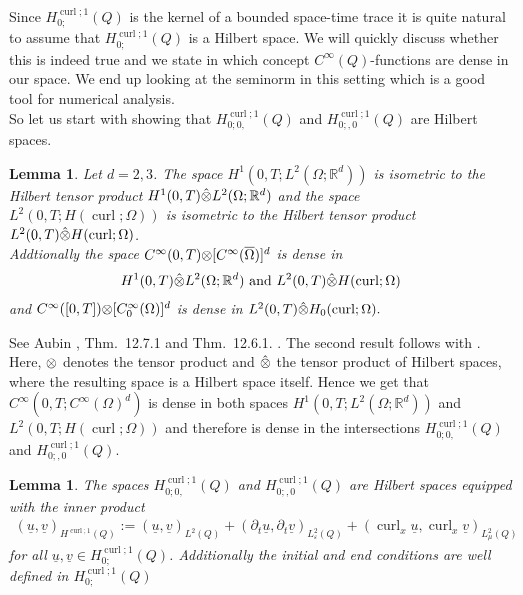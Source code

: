 \documentclass[a4paper,11pt]{article}
\newtheorem{lem}[thm]{Lemma}
\newcommand{\R}{\mathbb R}
\newcommand{\cu}{\operatorname{curl}}
\renewcommand{\vec}[1]{\underline{#1}}
\begin{document}
 
	Since $ H^{\cu;1}_{0;}(Q) $ is the kernel of a bounded space-time trace it is quite natural to assume that  $ H^{\cu;1}_{0;}(Q) $ is a Hilbert space. We will quickly discuss whether this is indeed true and we state in which concept $C^\infty(Q)$-functions are dense in our space. We end up looking at the  seminorm in this setting which is a good tool for numerical analysis.\\
So let us start with showing that  $H^{\cu;1}_{0;0,}(Q)$ and $H^{\cu;1}_{0;,0}(Q)$ are Hilbert spaces.

\begin{lem}\label{lem:C0inf_dense}
	Let $d=2,3$. The space $	H^1(0,T;L^2(\Omega;\R^d)) $ is isometric to the Hilbert tensor product $H^1(0,T)\hat{\tens}L^2(\Omega;\R^d)$ and the space $L^2(0,T;H(\cu;\Omega))$ is isometric to the Hilbert tensor product $ L^2(0,T)\hat{\tens}H(\cu;\Omega)$.\\
	Addtionally the space $C^\infty(0,T){\tens} [C^\infty(\overline{\Omega})]^d$ is dense in
	\begin{align*}
		H^1(0,T)\hat{\tens}L^2(\Omega;\R^d)\ \mathrm{ and }\	L^2(0,T)\hat{\tens}H(\cu;\Omega)
	\end{align*}
	and $C^\infty([0,T]){\tens} [C_0^\infty(\Omega)]^d $ is dense in $	L^2(0,T)\hat{\tens}H_0(\cu;\Omega).$
\end{lem}
See Aubin \cite{aubin}, Thm.~12.7.1 and Thm.~12.6.1. . The second result follows with \cite[ Ch 1.6.]{weidmann}.  Here, $\tens$  denotes the tensor product and $\hat{\tens}$ the tensor product of Hilbert spaces, where the resulting space is a Hilbert space itself. Hence we get that  {$C^\infty(0,T;C^\infty(\Omega)^d)$}  is  dense in both spaces $H^1(0,T;L^2(\Omega;\R^d))$ and $L^2(0,T;H(\cu;\Omega))$ and therefore is dense in the intersections $H^{\cu;1}_{0;0,}(Q)$ and $H^{\cu;1}_{0;,0}(Q)$.\\
\begin{lem}\label{lem:space_time_HR}
	The spaces $H^{\cu;1}_{0;0,}(Q)$ and $H^{\cu;1}_{0;,0}(Q)$ are Hilbert spaces equipped with the inner product 
	\begin{align}
		\label{eqn:scalar_prod}
		(\vec u, \vec v)_{H^{\cu;1}(Q)} := (\vec u,\vec v)_{L^2(Q)} +(\partial_t \vec u,\partial_t \vec v)_{L^2_{\varepsilon}(Q)}+(\cu_x \vec u,\cu_x \vec v)_{L^2_{\mu}(Q)}
	\end{align}
	for all $ \vec u,\vec v \in H^{\cu;1}_{0;}(Q)$. Additionally the initial and end conditions are well defined in $H^{\cu;1}_{0;}(Q)$
\end{lem}
\end{document}
